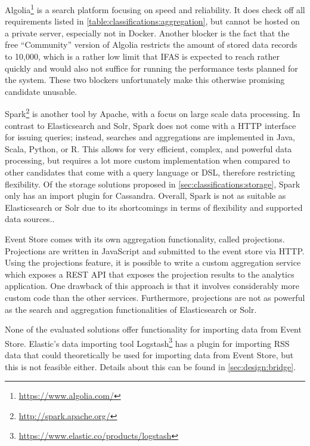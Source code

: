 Algolia\footnote{\url{https://www.algolia.com/}} is a search platform focusing on speed and reliability.
It does check off all requirements listed in \cref{table:classifications:aggregation}, but cannot be hosted on a private server, especially not in Docker.
Another blocker is the fact that the free ``Community'' version of Algolia restricts the amount of stored data records to 10,000, which is a rather low limit that \ac{IFAS} is expected to reach rather quickly and would also not suffice for running the performance tests planned for the system.
These two blockers unfortunately make this otherwise promising candidate unusable.

Spark\footnote{\url{http://spark.apache.org/}} is another tool by Apache, with a focus on large scale data processing.
In contrast to Elasticsearch and Solr, Spark does not come with a HTTP interface for issuing queries; instead, searches and aggregations are implemented in Java, Scala, Python, or R.
This allows for very efficient, complex, and powerful data processing, but requires a lot more custom implementation when compared to other candidates that come with a query language or \ac{DSL}, therefore restricting flexibility.
Of the storage solutions proposed in \cref{sec:classifications:storage}, Spark only has an import plugin for Cassandra.
Overall, Spark is not as suitable as Elasticsearch or Solr due to its shortcomings in terms of flexibility and supported data sources..

Event Store comes with its own aggregation functionality, called projections.
Projections are written in JavaScript and submitted to the event store via HTTP.
Using the projections feature, it is possible to write a custom aggregation service which exposes a \ac{REST} API that exposes the projection results to the analytics application.
One drawback of this approach is that it involves considerably more custom code than the other services.
Furthermore, projections are not as powerful as the search and aggregation functionalities of Elasticsearch or Solr.

None of the evaluated solutions offer functionality for importing data from Event Store.
Elastic's data importing tool Logstash\footnote{\url{https://www.elastic.co/products/logstash}} has a plugin for importing \ac{RSS} data that could theoretically be used for importing data from Event Store, but this is not feasible either.
Details about this can be found in \cref{sec:design:bridge}.

